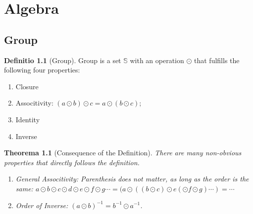 \documentclass[12pt, a4paper]{report}
\newtheorem{theorem}{Theorema}[section]
\theoremstyle{definition}
\newtheorem{definition}{Definitio}[section]
\theoremstyle{definition}
\theoremstyle{remark}
\begin{document}
\chapter{Algebra}
\section{Group}

\begin{definition}[Group]
Group is a set $\mathbb{S}$ with an operation $\odot$ that fulfills the following four properties:
\begin{enumerate}
	\item Closure
	\item Associtivity: $(a \odot b) \odot c = a \odot (b \odot c)$;
	\item Identity
	\item Inverse
\end{enumerate}
\end{definition}
\begin{theorem}[Consequence of the Definition]
There are many non-obvious properties that directly follows the definition.
\begin{enumerate}
	\item General Associtivity: Parenthesis does not matter, as long as the order is the same: 
		$a \odot b \odot c \odot d \odot e \odot f \odot g \cdots  = (a \odot ((b \odot c) \odot e (\odot f \odot g)\cdots) = \cdots$
	\item Order of Inverse: $(a \odot b)^{-1}=b^{-1}\odot a^{-1}$.  
\end{enumerate}
\end{theorem}
\end{document}
